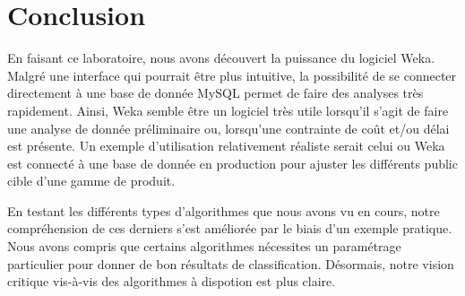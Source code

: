 \chapter{Conclusion}

En faisant ce laboratoire, nous avons découvert la puissance du logiciel Weka. Malgré une interface qui pourrait être plus intuitive, la possibilité de se connecter directement à une base de donnée MySQL permet de faire des analyses très rapidement. Ainsi, Weka semble être un logiciel très utile lorsqu'il s'agit de faire une analyse de donnée préliminaire ou, lorsqu'une contrainte de coût et/ou délai est présente. Un exemple d'utilisation relativement réaliste serait celui ou Weka est connecté à une base de donnée en production pour ajuster les différents public cible d'une gamme de produit.

En testant les différents types d'algorithmes que nous avons vu en cours, notre compréhension de ces derniers s'est améliorée par le biais d'un exemple pratique. Nous avons compris que certains algorithmes nécessites un paramétrage particulier pour donner de bon résultats de classification. Désormais, notre vision critique vis-à-vis des algorithmes à dispotion est plus claire.
